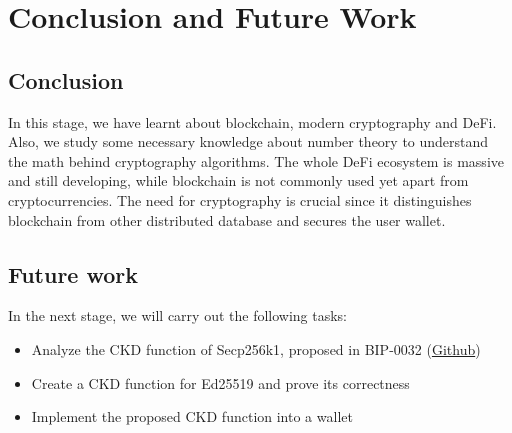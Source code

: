 \chapter{Conclusion and Future Work} \label{chap:conclusion}

\section{Conclusion}

In this stage, we have learnt about blockchain, modern cryptography and DeFi. Also, we study some necessary knowledge about number theory to understand the math behind cryptography algorithms. The whole DeFi ecosystem is massive and still developing, while blockchain is not commonly used yet apart from cryptocurrencies. The need for cryptography is crucial since it distinguishes blockchain from other distributed database and secures the user wallet.


\section{Future work}

In the next stage, we will carry out the following tasks:
\begin{itemize}
  \item Analyze the CKD function of Secp256k1, proposed in BIP-0032 (\href{https://github.com/bitcoin/bips/blob/master/bip-0032.mediawiki}{Github})
  \item Create a CKD function for Ed25519 and prove its correctness
  \item Implement the proposed CKD function into a wallet
\end{itemize}